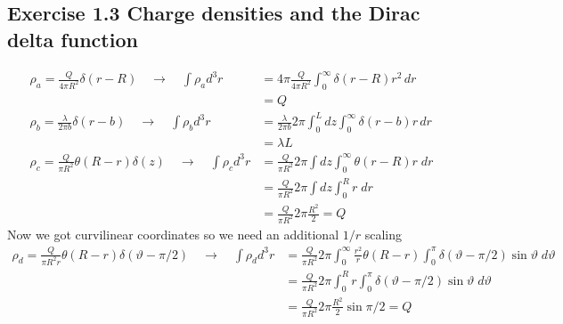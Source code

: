 \documentclass[10pt,a4paper]{book}
\theoremstyle{definition}
\begin{document}
\subsection{Exercise 1.3 Charge densities and the Dirac delta function}
\begin{align}
\rho_a=\frac{Q}{4\pi R^2}\delta(r-R)\quad\rightarrow\quad \int\rho_a d^3r&=4\pi\frac{Q}{4\pi R^2}\int_0^\infty\delta(r-R)r^2\,dr\\&=Q\\
\rho_b=\frac{\lambda}{2\pi b}\delta(r-b)\quad\rightarrow\quad \int\rho_b d^3r&=\frac{\lambda}{2\pi b}2\pi\int_0^Ldz\int_0^\infty \delta(r-b)r\,dr\\&=\lambda L\\
\rho_c=\frac{Q}{\pi R^2}\theta(R-r)\delta(z)\quad\rightarrow\quad \int\rho_c d^3r&=\frac{Q}{\pi R^2}2\pi\int dz\int_0^\infty\theta(r-R)r\;dr\\
&=\frac{Q}{\pi R^2}2\pi\int dz\int_0^Rr\;dr\\
&=\frac{Q}{\pi R^2}2\pi\frac{R^2}{2}=Q
\end{align}
Now we got curvilinear coordinates so we need an additional $1/r$ scaling
\begin{align}
\rho_d=\frac{Q}{\pi R^2r}\theta(R-r)\delta(\vartheta-\pi/2)\quad\rightarrow\quad \int\rho_d d^3r&=\frac{Q}{\pi R^2}2\pi\int_0^\infty \frac{r^2}{r}\theta(R-r)\int_0^\pi\delta(\vartheta-\pi/2)\sin\vartheta\;d\vartheta\\
&=\frac{Q}{\pi R^2}2\pi\int_0^R r\int_0^\pi\delta(\vartheta-\pi/2)\sin\vartheta\;d\vartheta\\
&=\frac{Q}{\pi R^2}2\pi \frac{R^2}{2}\sin\pi/2=Q
\end{align}
\end{document}
